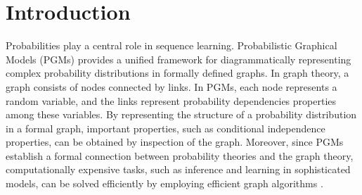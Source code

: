 
\chapter{Introduction}
\label{cha:intro}










Probabilities play a central role in sequence learning.
Probabilistic Graphical Models (PGMs)
\cite{koller2009probabilistic} provides a unified framework for
diagrammatically representing complex probability distributions
in formally defined graphs. In graph theory, a graph consists of
nodes connected by links. In PGMs, each node represents a random
variable, and the links represent probability dependencies
properties among these variables. By representing the structure
of a probability distribution in a formal graph, important
properties, such as conditional independence properties, can be
obtained by inspection of the graph. Moreover, since PGMs
establish a formal connection between probability theories and
the graph theory, computationally expensive tasks, such as
inference and learning in sophisticated models, can be solved
efficiently by employing efficient graph algorithms
\cite{Ladicky:ECCV10,Rother:CVPR09,Kohli:TR08}.

